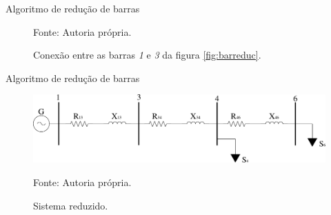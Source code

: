 \documentclass[10pt]{beamer}
\begin{document}
\begin{frame}{Algoritmo de redução de barras}
    \begin{figure}[h]
      \centering
      \caption{Conexão entre as barras \textit{1} e \textit{3} da figura \ref{fig:barreduc}.}
      \label{fig:barreduc2}
      
      
      
      \small Fonte: Autoria própria.
    \end{figure}
\end{frame}

\begin{frame}{Algoritmo de redução de barras}
  \begin{figure}[h]
    \centering
    \caption{Sistema reduzido.}
    \includegraphics[width=\textwidth]{img/barreduc4}
    \label{fig:barreduc4}
    
    \small Fonte: Autoria própria.
  \end{figure}
\end{frame}
\end{document}

